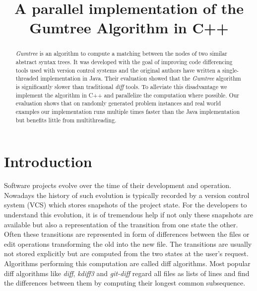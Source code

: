 \documentclass[letterpaper]{article}
\title{A parallel implementation of the Gumtree Algorithm in C++}
\begin{document}
%
\maketitle
%

\begin{abstract}

\emph{Gumtree} is an algorithm to compute a matching between the nodes of two similar abstract syntax trees.
It was developed with the goal of improving code differencing tools used with version control systems and the original authors have written a single-threaded implementation in Java.
Their evaluation showed that the \emph{Gumtree} algorithm is significantly slower than traditional \emph{diff} tools.
To alleviate this disadvantage we implement the algorithm in C++ and parallelize the computation where possible.
Our evaluation shows that on randomly generated problem instances and real world examples our implementation runs multiple times faster than the Java implementation but benefits little from multithreading.
\end{abstract}

\section{Introduction}\label{sec:intro}


Software projects evolve over the time of their development and operation.
Nowadays the history of such evolution is typically recorded by a version control system (VCS) which stores snapshots of the project state.
For the developers to understand this evolution, it is of tremendous help if not only these snapshots are available but also a representation of the transition from one state the other.
Often these transitions are represented in form of differences between the files or edit operations transforming the old into the new file.
The transitions are usually not stored explicitly but are computed from the two states at the user's request.
Algorithms performing this computation are called diff algorithms.
Most popular diff algorithms like \emph{diff}, \emph{kdiff3} and \emph{git-diff} regard all files as lists of lines and find the differences between them by computing their longest common subsequence.
\end{document}

